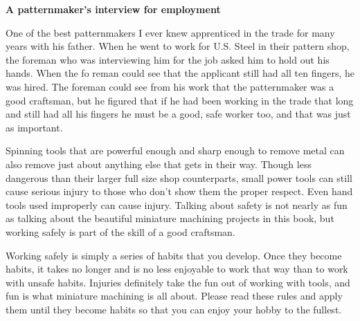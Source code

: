 \secdown\secdown

\textbf{A patternmaker's interview for employment}

\bigskip
One of the best patternmakers I ever knew apprenticed in the trade for many
years with his father. When he went to work for U.S. Steel in their pattern
shop, the foreman who was interviewing him for the job asked him to hold out his
hands. When the fo reman could see that the applicant still had all ten fingers,
he was hired. The foreman could see from his work that the patternmaker was a
good craftsman, but he figured that if he had been working in the trade that
long and still had all his fingers he must be a good, safe worker too, and that
was just as important.

Spinning tools that are powerful enough and sharp enough to remove metal can
also remove just about anything else that gets in their way. Though less
dangerous than their larger full size shop counterparts, small power tools can
still cause serious injury to those who don't show them the proper respect. Even
hand tools used improperly can cause injury. Talking about safety is not nearly
as fun as talking about the beautiful miniature machining projects in this book,
but working safely is part of the skill of a good craftsman.

Working safely is simply a series of habits that you develop. Once they become
habits, it takes no longer and is no less enjoyable to work that way than to
work with unsafe habits. Injuries definitely take the fun out of working with
tools, and fun is what miniature machining is all about. Please read these rules
and apply them until they become habits so that you can enjoy your hobby to the
fullest.

